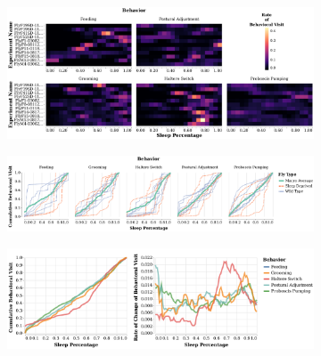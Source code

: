 \begin{figure}[ht!]
	\centering
	\begin{subfigure}[ht!]{0.975\linewidth}
		\centering\includegraphics[width=\linewidth]{figures/Heatmap_BehavioralUsage-Ann.pdf}
		\caption{}
	\end{subfigure}%

	\centering
	\begin{subfigure}[ht!]{0.975\linewidth}
		\centering\includegraphics[width=\linewidth]{figures/CumulativeLine_BehavioralUsage-Ann.pdf}
		\caption{}
	\end{subfigure}%

	\centering
	\begin{subfigure}[ht!]{0.825\linewidth}
		\centering\includegraphics[width=\linewidth]{figures/MeanCumRofC_BehavioralUsage-Ann.pdf}
		\caption{}
	\end{subfigure}%


\end{figure}
